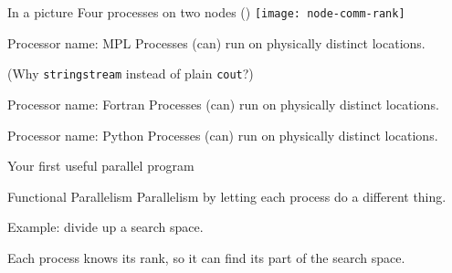 \begin{numberedframe}{In a picture}
  Four processes on two nodes ()
  \texttt{[image: node-comm-rank]}
\end{numberedframe}

\begin{mpl}
  \addtocounter{slidecount}{-1}
\begin{numberedframe}[l]{Processor name: MPL}
  Processes (can) run on physically distinct locations.


  (Why \lstinline{stringstream} instead of plain \lstinline{cout}?)
\end{numberedframe}
\end{mpl}

\begin{fortran}
  \addtocounter{slidecount}{-1}
\begin{numberedframe}[f]{Processor name: Fortran}
  Processes (can) run on physically distinct locations.

\end{numberedframe}
\end{fortran}

\begin{python}
  \addtocounter{slidecount}{-1}
\begin{numberedframe}[p]{Processor name: Python}
  Processes (can) run on physically distinct locations.

\end{numberedframe}
\end{python}



 {Your first useful parallel program}

\begin{numberedframe}{Functional Parallelism}
  Parallelism by letting each process do a different thing.

  Example: divide up a search space.

  Each process knows its rank, so it can find its part of the search space.
\end{numberedframe}

\begin{exerciseframe}[prime]
  
\end{exerciseframe}

\begin{exerciseframe}
  
\end{exerciseframe}

\endinput

\begin{numberedframe}\frametitle{}
\begin{lstlisting}
  
\end{lstlisting}
\end{numberedframe}

